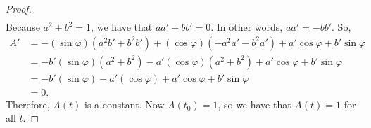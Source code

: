 \documentclass[10pt]{article}
\begin{document}
\begin{itemize}
\begin{proof}
\begin{align*}
      \end{align*}
      Because $a^2 + b^2 = 1$, we have that $aa' + bb' = 0$. In other words, $aa' = -bb'$. So,
      \begin{align*}
        A'
        &= -(\sin\varphi ) (a^2b' + b^2 b') + (\cos \varphi) (-a^2 a' - b^2a') + a' \cos \varphi + b' \sin\varphi\\
        &= -b'(\sin\varphi ) (a^2 + b^2) - a'(\cos \varphi) (a^2  + b^2) + a' \cos \varphi + b' \sin\varphi\\
        &= -b'(\sin\varphi ) - a'(\cos \varphi) + a' \cos \varphi + b' \sin\varphi\\
        &= 0.
      \end{align*}
      Therefore, $A(t)$ is a constant. Now $A(t_0) = 1$, so we have that $A(t) = 1$ for all $t$.      
    \end{proof}


\end{itemize}
\end{document}
